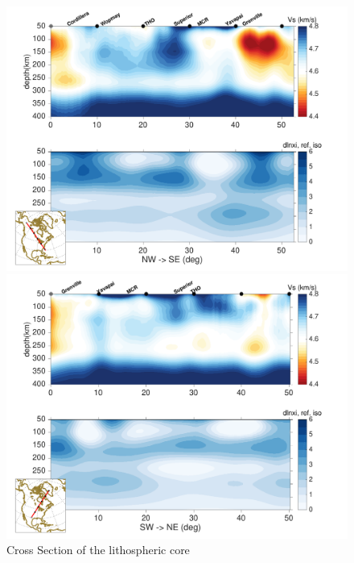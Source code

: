 \documentclass[12pt]{article}
\begin{document}
\begin{figure}
	\begin{minipage}{0.5\linewidth}
		\centerline{\includegraphics[width=\linewidth]{figures/profiles_NASEM3_vs_dxi_A.pdf}}
	\end{minipage}
	\hfill
	\begin{minipage}{0.5\linewidth}
		\centerline{\includegraphics[width=\linewidth]{figures/profiles_NASEM3_vs_dxi_B.pdf}}
	\end{minipage}

	\caption{Cross Section of the lithospheric core}
	\label{cratoncross}

\end{figure}
\end{document}
